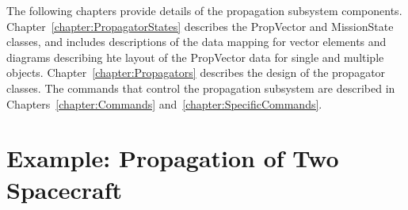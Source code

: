 The following chapters provide details of the propagation subsystem components.
Chapter~\ref{chapter:PropagatorStates} describes the PropVector and MissionState classes, and
includes descriptions of the data mapping for vector elements and diagrams describing hte layout of
the PropVector data for single and multiple objects.  Chapter~\ref{chapter:Propagators} describes
the design of the propagator classes.  The commands that control the propagation subsystem are
described in Chapters~\ref{chapter:Commands} and~\ref{chapter:SpecificCommands}.


%
%
%
%
%
%
%
%
%
\section{\label{section:PropagationExample}Example: Propagation of Two Spacecraft}

